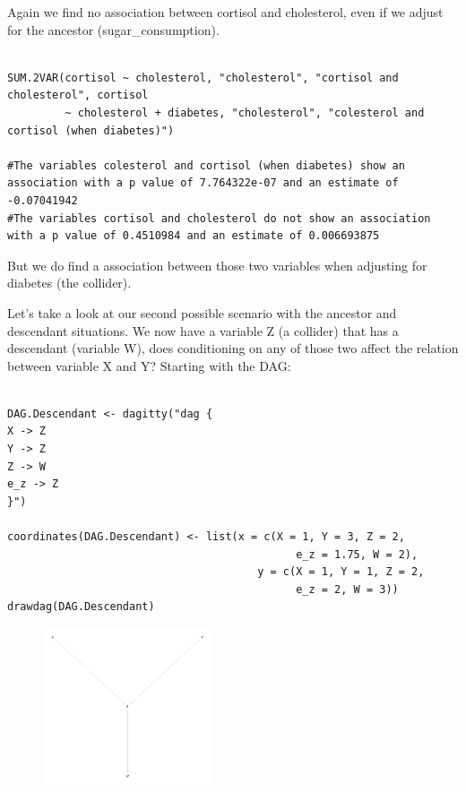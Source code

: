 \documentclass{article}
\begin{document}
Again we find no association between cortisol and cholesterol, even if we adjust for the ancestor (sugar\_consumption).



\begin{lstlisting}

SUM.2VAR(cortisol ~ cholesterol, "cholesterol", "cortisol and cholesterol", cortisol 
         ~ cholesterol + diabetes, "cholesterol", "colesterol and cortisol (when diabetes)")

#The variables colesterol and cortisol (when diabetes) show an association with a p value of 7.764322e-07 and an estimate of -0.07041942 
#The variables cortisol and cholesterol do not show an association with a p value of 0.4510984 and an estimate of 0.006693875 

\end{lstlisting}


But we do find a association between those two variables when adjusting for diabetes (the collider).

Let's take a look at our second possible scenario with the ancestor and descendant situations. We now have a variable Z (a collider) that has a descendant (variable W), does conditioning on any of those two affect the relation between variable X and Y?
Starting with the DAG:

\begin{lstlisting}

DAG.Descendant <- dagitty("dag {
X -> Z
Y -> Z
Z -> W
e_z -> Z
}")

coordinates(DAG.Descendant) <- list(x = c(X = 1, Y = 3, Z = 2, 
                                             e_z = 1.75, W = 2),
                                       y = c(X = 1, Y = 1, Z = 2, 
                                             e_z = 2, W = 3))
drawdag(DAG.Descendant)

\end{lstlisting}


\begin{figure}[h]
\includegraphics[width=5cm]{DAG_DESCENDANT.png}
\centering
\end{figure}
\end{document}
